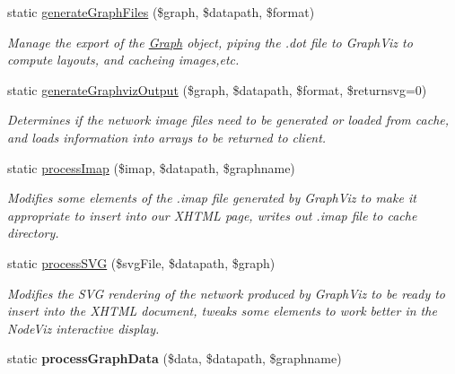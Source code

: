 \begin{DoxyCompactItemize}
\item 
static \hyperlink{classGraphVizExporter_a5ffcde0b5a56dd0a8ac57680f247520b}{generateGraphFiles} (\$graph, \$datapath, \$format)
\begin{DoxyCompactList}\small\item\em Manage the export of the \hyperlink{classGraph}{Graph} object, piping the .dot file to GraphViz to compute layouts, and cacheing images,etc. \item\end{DoxyCompactList}\item 
static \hyperlink{classGraphVizExporter_a7f97288f0c6800015bbe0101cbe38b7d}{generateGraphvizOutput} (\$graph, \$datapath, \$format, \$returnsvg=0)
\begin{DoxyCompactList}\small\item\em Determines if the network image files need to be generated or loaded from cache, and loads information into arrays to be returned to client. \item\end{DoxyCompactList}\item 
static \hyperlink{classGraphVizExporter_ae10671113e79e66c0cd8b5ea3113b76c}{processImap} (\$imap, \$datapath, \$graphname)
\begin{DoxyCompactList}\small\item\em Modifies some elements of the .imap file generated by GraphViz to make it appropriate to insert into our XHTML page, writes out .imap file to cache directory. \item\end{DoxyCompactList}\item 
static \hyperlink{classGraphVizExporter_a514360e45b911c0efcf51c3ffb4e783a}{processSVG} (\$svgFile, \$datapath, \$graph)
\begin{DoxyCompactList}\small\item\em Modifies the SVG rendering of the network produced by GraphViz to be ready to insert into the XHTML document, tweaks some elements to work better in the NodeViz interactive display. \item\end{DoxyCompactList}\item 
\hypertarget{classGraphVizExporter_a9312bb23e4f82aee8beee585cc28e5a3}{
static {\bfseries processGraphData} (\$data, \$datapath, \$graphname)}
\label{classGraphVizExporter_a9312bb23e4f82aee8beee585cc28e5a3}

\end{DoxyCompactItemize}
